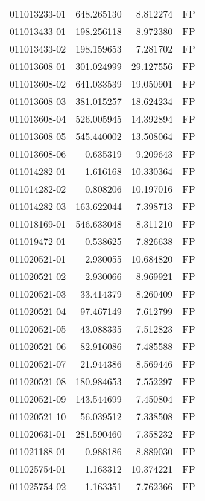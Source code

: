 \begin{tabular}{lrrl}
011013233-01 &  648.265130 &       8.812274 &   FP \\
011013433-01 &  198.256118 &       8.972380 &   FP \\
011013433-02 &  198.159653 &       7.281702 &   FP \\
011013608-01 &  301.024999 &      29.127556 &   FP \\
011013608-02 &  641.033539 &      19.050901 &   FP \\
011013608-03 &  381.015257 &      18.624234 &   FP \\
011013608-04 &  526.005945 &      14.392894 &   FP \\
011013608-05 &  545.440002 &      13.508064 &   FP \\
011013608-06 &    0.635319 &       9.209643 &   FP \\
011014282-01 &    1.616168 &      10.330364 &   FP \\
011014282-02 &    0.808206 &      10.197016 &   FP \\
011014282-03 &  163.622044 &       7.398713 &   FP \\
011018169-01 &  546.633048 &       8.311210 &   FP \\
011019472-01 &    0.538625 &       7.826638 &   FP \\
011020521-01 &    2.930055 &      10.684820 &   FP \\
011020521-02 &    2.930066 &       8.969921 &   FP \\
011020521-03 &   33.414379 &       8.260409 &   FP \\
011020521-04 &   97.467149 &       7.612799 &   FP \\
011020521-05 &   43.088335 &       7.512823 &   FP \\
011020521-06 &   82.916086 &       7.485588 &   FP \\
011020521-07 &   21.944386 &       8.569446 &   FP \\
011020521-08 &  180.984653 &       7.552297 &   FP \\
011020521-09 &  143.544699 &       7.450804 &   FP \\
011020521-10 &   56.039512 &       7.338508 &   FP \\
011020631-01 &  281.590460 &       7.358232 &   FP \\
011021188-01 &    0.988186 &       8.889030 &   FP \\
011025754-01 &    1.163312 &      10.374221 &   FP \\
011025754-02 &    1.163351 &       7.762366 &   FP \\

\end{tabular}
